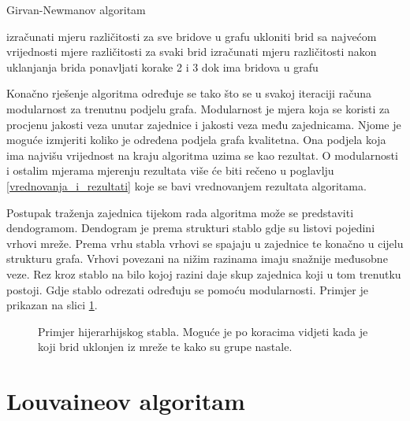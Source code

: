 \bigskip
\begin{algorithm}
\caption{Girvan-Newmanov algoritam}
\begin{algorithmic}[1]
	\STATE izračunati mjeru različitosti za sve bridove u grafu
	\STATE ukloniti brid sa najvećom vrijednosti mjere različitosti
	\STATE za svaki brid izračunati mjeru različitosti nakon uklanjanja brida
	\STATE ponavljati korake 2 i 3 dok ima bridova u grafu
\end{algorithmic}
\end{algorithm}
\bigskip

Konačno rješenje algoritma određuje se tako što se u svakoj iteraciji računa modularnost za trenutnu podjelu grafa. Modularnost je mjera koja se koristi za procjenu jakosti veza unutar zajednice i jakosti veza među zajednicama. Njome je moguće izmjeriti koliko je određena podjela grafa kvalitetna. Ona podjela koja ima najvišu vrijednost na kraju algoritma uzima se kao rezultat. O modularnosti i ostalim mjerama mjerenju rezultata više će biti rečeno u poglavlju \ref{vrednovanja_i_rezultati} koje se bavi vrednovanjem rezultata algoritama.


Postupak traženja zajednica tijekom rada algoritma može se predstaviti dendogramom. Dendogram je prema strukturi stablo gdje su listovi pojedini vrhovi mreže. Prema vrhu stabla vrhovi se spajaju u zajednice te konačno u cijelu strukturu grafa. Vrhovi povezani na nižim razinama imaju snažnije međusobne veze. Rez kroz stablo na bilo kojoj razini daje skup zajednica koji u tom trenutku postoji. Gdje stablo odrezati određuju se pomoću modularnosti. Primjer je prikazan na slici \ref{fig:dendogram}.

\begin{figure}
	\caption{Primjer hijerarhijskog stabla. Moguće je po koracima vidjeti kada je koji brid uklonjen iz mreže te kako su grupe nastale.}
	\label{fig:dendogram}
\end{figure}


\section{Louvaineov algoritam}